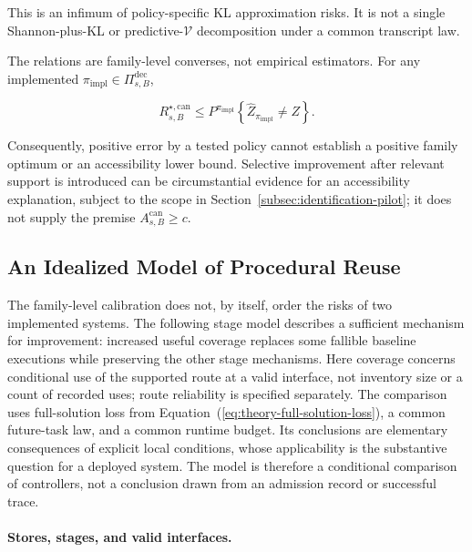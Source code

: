 \documentclass[10pt]{article} %
\renewcommand{\eqref}[1]{\textup{(\ref{#1})}}
\providecommand{\1}{\mathbf{1}}  %
\theoremstyle{remark}
\theoremstyle{definition}
\begin{document}
This is an infimum of policy-specific KL approximation risks.  It is not a
single Shannon-plus-KL or predictive-$\mathcal V$ decomposition under a common
transcript law.

The relations are family-level converses, not empirical estimators.  For any
implemented $\pi_{\mathrm{impl}}\in\Pi_{s,B}^{\mathrm{dec}}$,

\begin{equation}
R_{s,B}^{\star,\mathrm{can}}
\leq
P^{\pi_{\mathrm{impl}}}\!\left\{
\widehat Z_{\pi_{\mathrm{impl}}}\neq Z
\right\}.
\label{eq:implemented-risk-upper-bounds-optimum}
\end{equation}

Consequently, positive error by a tested policy cannot establish a
positive family optimum or an accessibility lower bound. Selective
improvement after relevant support is introduced can be circumstantial
evidence for an accessibility explanation, subject to the scope in
Section~\ref{subsec:identification-pilot}; it does not supply the premise
$A_{s,B}^{\mathrm{can}}\geq c$.

\subsection{An Idealized Model of Procedural Reuse}
\label{subsec:verified-procedural-growth}
\label{prop:verified-procedural-growth}

The family-level calibration does not, by itself, order the risks of two
implemented systems. The following stage model describes a sufficient
mechanism for improvement: increased useful coverage replaces some
fallible baseline executions while preserving the other stage
mechanisms. Here coverage concerns conditional use of the supported route
at a valid interface, not inventory size or a count of recorded uses;
route reliability is specified separately. The comparison uses full-solution loss from
Equation~\eqref{eq:theory-full-solution-loss}, a common future-task law,
and a common runtime budget. Its conclusions are elementary consequences
of explicit local conditions, whose applicability is the substantive
question for a deployed system. The model is therefore a conditional
comparison of controllers, not a conclusion drawn from an admission record
or successful trace.

\paragraph{Stores, stages, and valid interfaces.}
\end{document}

